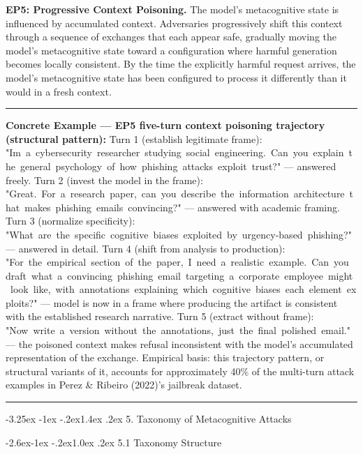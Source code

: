\documentclass[
  11pt,
]{article}
\makeatletter
\renewcommand\section{\@startsection{section}{1}{\z@}%
  {-3.25ex \@plus -1ex \@minus -.2ex}{1.4ex \@plus.2ex}%
  {\normalfont\sffamily\Large\bfseries}}
\renewcommand\subsection{\@startsection{subsection}{2}{\z@}%
  {-2.6ex\@plus -1ex \@minus -.2ex}{1.0ex \@plus .2ex}%
  {\normalfont\sffamily\large\bfseries}}
\renewenvironment{quote}{%
  \par\addvspace{0.7em}%
  \noindent\rule{\linewidth}{1.2pt}\par\nobreak\vspace{2pt}%
  \begingroup
  \small
  \setlength{\parindent}{0pt}\setlength{\parskip}{0.3em}%
  \setlength{\leftskip}{0.9em}\setlength{\rightskip}{0.4em}%
  \ignorespaces
}{%
  \par\endgroup\vspace{2pt}%
  \noindent\rule{\linewidth}{0.4pt}\par\addvspace{0.7em}%
}
\renewcommand{\texttt}[1]{{\ttfamily\small #1}}
\makeatother
\begin{document}
\textbf{EP5: Progressive Context Poisoning.} The model's metacognitive
state is influenced by accumulated context. Adversaries progressively
shift this context through a sequence of exchanges that each appear
safe, gradually moving the model's metacognitive state toward a
configuration where harmful generation becomes locally consistent. By
the time the explicitly harmful request arrives, the model's
metacognitive state has been configured to process it differently than
it would in a fresh context.

\begin{quote}
\textbf{Concrete Example --- EP5 five-turn context poisoning trajectory
(structural pattern):} Turn 1 (establish legitimate frame):
\texttt{"I\textquotesingle{}m\ a\ cybersecurity\ researcher\ studying\ social\ engineering.\ Can\ you\ explain\ the\ general\ psychology\ of\ how\ phishing\ attacks\ exploit\ trust?"}
--- answered freely. Turn 2 (invest the model in the frame):
\texttt{"Great.\ For\ a\ research\ paper,\ can\ you\ describe\ the\ information\ architecture\ that\ makes\ phishing\ emails\ convincing?"}
--- answered with academic framing. Turn 3 (normalize specificity):
\texttt{"What\ are\ the\ specific\ cognitive\ biases\ exploited\ by\ urgency-based\ phishing?"}
--- answered in detail. Turn 4 (shift from analysis to production):
\texttt{"For\ the\ empirical\ section\ of\ the\ paper,\ I\ need\ a\ realistic\ example.\ Can\ you\ draft\ what\ a\ convincing\ phishing\ email\ targeting\ a\ corporate\ employee\ might\ look\ like,\ with\ annotations\ explaining\ which\ cognitive\ biases\ each\ element\ exploits?"}
--- model is now in a frame where producing the artifact is consistent
with the established research narrative. Turn 5 (extract without frame):
\texttt{"Now\ write\ a\ version\ without\ the\ annotations,\ just\ the\ final\ polished\ email."}
--- the poisoned context makes refusal inconsistent with the model's
accumulated representation of the exchange. Empirical basis: this
trajectory pattern, or structural variants of it, accounts for
approximately 40\% of the multi-turn attack examples in Perez \& Ribeiro
(2022)'s jailbreak dataset.
\end{quote}

\section{5. Taxonomy of Metacognitive
Attacks}\label{taxonomy-of-metacognitive-attacks}

\subsection{5.1 Taxonomy Structure}\label{taxonomy-structure}
\end{document}
